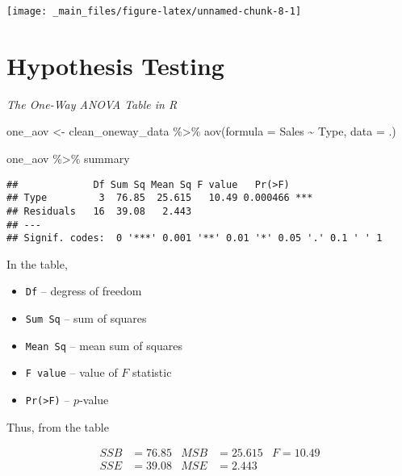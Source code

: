\documentclass[
]{book}
\newenvironment{Shaded}{\begin{snugshade}}{\end{snugshade}}
\newcommand{\AttributeTok}[1]{\textcolor[rgb]{0.77,0.63,0.00}{#1}}
\newcommand{\FunctionTok}[1]{\textcolor[rgb]{0.00,0.00,0.00}{#1}}
\newcommand{\NormalTok}[1]{#1}
\newcommand{\OtherTok}[1]{\textcolor[rgb]{0.56,0.35,0.01}{#1}}
\newcommand{\SpecialCharTok}[1]{\textcolor[rgb]{0.00,0.00,0.00}{#1}}
\providecommand{\tightlist}{%
  \setlength{\itemsep}{0pt}\setlength{\parskip}{0pt}}
\begin{document}
\begin{center}\texttt{[image: \_main\_files/figure-latex/unnamed-chunk-8-1]} \end{center}

\hypertarget{hypothesis-testing}{%
\chapter{Hypothesis Testing}\label{hypothesis-testing}}

\emph{The One-Way ANOVA Table in R}

\begin{Shaded}
\begin{Highlighting}[]
\NormalTok{one\_aov }\OtherTok{\textless{}{-}}\NormalTok{ clean\_oneway\_data }\SpecialCharTok{\%\textgreater{}\%} 
  \FunctionTok{aov}\NormalTok{(}\AttributeTok{formula =}\NormalTok{ Sales }\SpecialCharTok{\textasciitilde{}}\NormalTok{ Type, }\AttributeTok{data =}\NormalTok{ .)}
  
\NormalTok{one\_aov }\SpecialCharTok{\%\textgreater{}\%} 
\NormalTok{  summary}
\end{Highlighting}
\end{Shaded}

\begin{verbatim}
##             Df Sum Sq Mean Sq F value   Pr(>F)    
## Type         3  76.85  25.615   10.49 0.000466 ***
## Residuals   16  39.08   2.443                     
## ---
## Signif. codes:  0 '***' 0.001 '**' 0.01 '*' 0.05 '.' 0.1 ' ' 1
\end{verbatim}

In the table,

\begin{itemize}
\tightlist
\item
  \texttt{Df} -- degress of freedom
\item
  \texttt{Sum\ Sq} -- sum of squares
\item
  \texttt{Mean\ Sq} -- mean sum of squares
\item
  \texttt{F\ value} -- value of \(F\) statistic
\item
  \texttt{Pr(\textgreater{}F)} -- \(p\)-value
\end{itemize}

Thus, from the table

\begin{align}
    SSB &= 76.85 & MSB &= 25.615 & F = 10.49\\
    SSE &= 39.08 & MSE &= 2.443  & \\
  \end{align}
\end{document}
